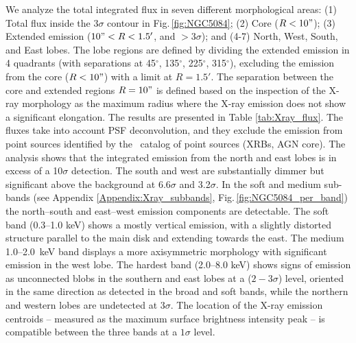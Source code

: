 \documentclass[modern]{CORE-AAS/aastex631}
\begin{document}
We analyze the total integrated flux in seven different morphological areas: (1) Total %
flux inside the $3\sigma$ contour in Fig.\,\ref{fig:NGC5084}; (2) Core ($R<10"$); (3) Extended emission ($10"<R<1.5'$, and $>3\sigma$); and (4-7) North, West, South, and East lobes. The lobe regions are defined by dividing the extended emission in 4 quadrants (with separations at 45$^{\circ}$, 135$^{\circ}$, 225$^{\circ}$, 315$^{\circ}$), excluding the emission from the core ($R<10"$) with a limit at $R=1.5'$. The separation between the core and extended regions $R=10"$ is defined based on the inspection of the X-ray morphology as the maximum radius where the X-ray emission does not show a significant elongation. The results are presented in Table \ref{tab:Xray_flux}. The fluxes take into account PSF deconvolution, and they exclude the emission from point sources identified by the \Chandra\ catalog of point sources (XRBs, AGN core). The analysis shows that the integrated emission from the north and east lobes is in excess of a 10$\sigma$ detection. The south and west are substantially dimmer but significant above the background at 6.6$\sigma$ and 3.2$\sigma$. 
In the soft and medium sub-bands (see Appendix \ref{Appendix:Xray_subbands}, Fig.\,\ref{fig:NGC5084_per_band}) the north--south and east--west emission components are detectable. The soft band (0.3--1.0 keV) shows a mostly vertical emission, with a slightly distorted structure parallel to the main disk and extending towards the east. The medium 1.0--2.0~keV band displays a more axisymmetric morphology with significant emission in the west lobe. The hardest band (2.0--8.0 keV) shows signs of emission as unconnected blobs in the southern and east lobes at a ($2-3\sigma$) level, oriented in the same direction as detected in the broad and soft bands, while the northern and western lobes are undetected at $3\sigma$. The location of the X-ray emission centroids -- measured as the maximum surface brightness intensity peak -- is compatible between the three bands at a $1\sigma$ level.
\end{document}

